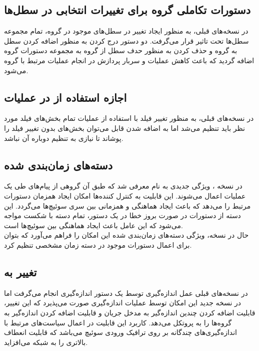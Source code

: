 \subsection{دستورات تکاملی گروه برای تغییرات انتخابی در سطل‌ها}
در نسخه‌های قبلی، به منظور ایجاد تغییر در سطل‌های موجود در گروه، تمام مجموعه سطل‌ها تحت تاثیر قرار می‌گرفت. دو دستور درج کردن به منظور اضافه کردن سطل به گروه و حذف کردن به منظور حدف سطل از گروه به مجموعه دستورات گروه اضافه گردید که باعث کاهش عملیات و سربار پردازش در انجام عملیات مرتبط با گروه می‌شود.

\subsection{اجازه استفاده از  در عملیات }
در نسخه‌های قبلی، به منظور تغییر فیلد با استفاده از عملیات  تمام بخش‌های فیلد مورد نظر باید تنظیم می‌شد اما به اضافه شدن قابل  می‌توان بخش‌های بدون تغییر فیلد را پوشاند تا نیازی به تنظیم دوباره آن نباشد.

\subsection{دسته‌های زمان‌بندی شده}
در نسخه ، ویژگی جدیدی به نام  معرفی شد که طبق آن گروهی از پیام‌های  طی یک عملیات اعمال می‌شوند. این قابلیت به کنترل کننده‌ها امکان ایجاد همزمان دستورات مرتبط را می‌دهد که باعث ایجاد هماهنگی و همزمانی بین سری سوئیچ‌ها می‌گردد. این دسته از دستورات در صورت بروز خطا در یک دستور، تمام دسته با شکست مواجه می‌شود که این عامل باعث ایجاد هماهنگی بین سوئیچ‌ها است.\\
حال در نسخه، ویژگی دسته‌های زمان‌بندی شده این امکان را فراهم می‌آورد که بتوان برای اعمال دستورات موجود در دسته زمان مشخصی تنظیم کرد.

\subsection{تغییر  به }
در نسخه‌های قبلی عمل اندازه‌گیری توسط یک دستور اندازه‌گیری انجام می‌گرفت اما در نسخه جدید این امکان توسط عملیات اندازه‌گیری صورت می‌پذیرد که این تغییر، قابلیت اضافه کردن چندین اندازه‌گیر به مدخل جریان و قابلیت اضافه کردن اندازه‌گیر به گروه‌ها را به پروتکل می‌دهد. کاربرد این قابلیت در اعمال سیاست‌های مرتبط با اندازه‌گیری‌های چندگانه بر روی ترافیک ورودی سوئیچ می‌باشد که قابلیت انعطاف بالاتری را به شبکه می‌افزاید.


